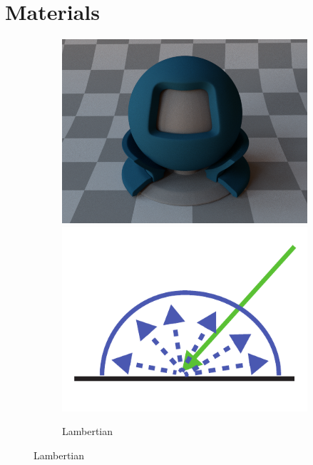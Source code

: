 \documentclass{article}
\begin{document}
\section{Materials}
\begin{figure}
    \centering
    \begin{subfigure}[t]{0.32\linewidth}
        \centering
        \begin{minipage}[t]{\linewidth}
            \includegraphics[width=\linewidth]{imgs/lambertian_render.png}
            \includegraphics[width=\linewidth]{imgs/lambertian.pdf}
        \end{minipage}
        \caption{Lambertian}
        \label{fig:lambertian}
    \end{subfigure}

\end{figure}
\end{document}
